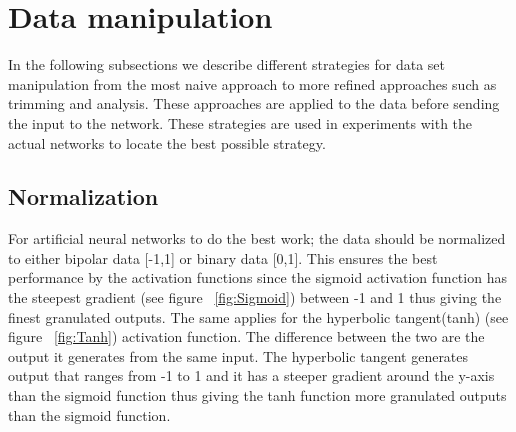 \section{Data manipulation}
\label{sec:DataManipulation}
In the following subsections we describe different strategies for data set manipulation from the most naive approach to more refined approaches such as trimming and analysis. These approaches are applied to the data before sending the input to the network. These strategies are used in experiments with the actual networks to locate the best possible strategy.

\subsection{Normalization}
For artificial neural networks to do the best work; the data should be normalized to either bipolar data [-1,1] or binary data [0,1]. This ensures the best performance by the activation functions since the sigmoid activation function has the steepest gradient (see figure ~\ref{fig:Sigmoid}) between -1 and 1 thus giving the finest granulated outputs. The same applies for the hyperbolic tangent(tanh) (see figure ~\ref{fig:Tanh}) activation function. The difference between the two are the output it generates from the same input. The hyperbolic tangent generates output that ranges from -1 to 1 and it has a steeper gradient around the y-axis than the sigmoid function thus giving the tanh function more granulated outputs than the sigmoid function.

